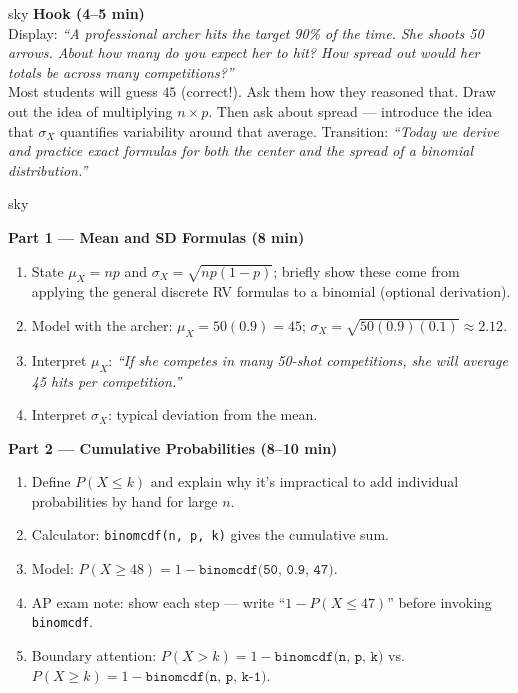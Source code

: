 \documentclass[10pt]{article}
\begin{document}
\begin{skillbox}[Hook]{sky}
    \textbf{Hook (4--5 min)}\\
    Display: \textit{``A professional archer hits the target 90\% of the time.
    She shoots 50 arrows. About how many do you expect her to hit?
    How spread out would her totals be across many competitions?''}\\[4pt]
    Most students will guess $45$ (correct!). Ask them how they reasoned that.
    Draw out the idea of multiplying $n \times p$.
    Then ask about spread --- introduce the idea that $\sigma_X$ quantifies
    variability around that average.
    Transition: \textit{``Today we derive and practice exact formulas for both
    the center and the spread of a binomial distribution.''}
\end{skillbox}

\begin{skillbox}[Lesson]{sky}
\begin{minipage}[t]{0.48\linewidth}
    \textbf{Part 1 --- Mean and SD Formulas (8 min)}
    \begin{enumerate}
        \item State $\mu_X = np$ and $\sigma_X = \sqrt{np(1-p)}$; briefly show
              these come from applying the general discrete RV formulas to a
              binomial (optional derivation).
        \item Model with the archer: $\mu_X = 50(0.9) = 45$;
              $\sigma_X = \sqrt{50(0.9)(0.1)} \approx 2.12$.
        \item Interpret $\mu_X$: \textit{``If she competes in many 50-shot
              competitions, she will average 45 hits per competition.''}
        \item Interpret $\sigma_X$: typical deviation from the mean.
    \end{enumerate}
\end{minipage}
\hfill
\begin{minipage}[t]{0.48\linewidth}
    \textbf{Part 2 --- Cumulative Probabilities (8--10 min)}
    \begin{enumerate}
        \item Define $P(X \le k)$ and explain why it's impractical to add
              individual probabilities by hand for large $n$.
        \item Calculator: \texttt{binomcdf(n, p, k)} gives the cumulative sum.
        \item Model: $P(X \ge 48) = 1 - \texttt{binomcdf(50, 0.9, 47)}$.
        \item AP exam note: show each step ---
              write ``$1 - P(X \le 47)$'' before invoking \texttt{binomcdf}.
        \item Boundary attention: $P(X > k) = 1 - \texttt{binomcdf(n, p, k)}$
              vs.\ $P(X \ge k) = 1 - \texttt{binomcdf(n, p, k-1)}$.
    \end{enumerate}
\end{minipage}
\end{skillbox}
\end{document}

